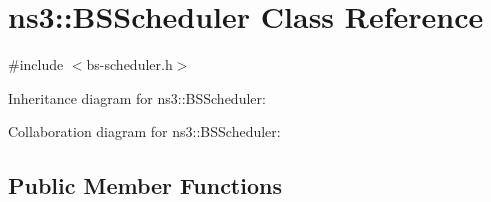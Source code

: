 \hypertarget{classns3_1_1BSScheduler}{}\section{ns3\+:\+:B\+S\+Scheduler Class Reference}
\label{classns3_1_1BSScheduler}


{\ttfamily \#include $<$bs-\/scheduler.\+h$>$}



Inheritance diagram for ns3\+:\+:B\+S\+Scheduler\+:


Collaboration diagram for ns3\+:\+:B\+S\+Scheduler\+:
\subsection*{Public Member Functions}
